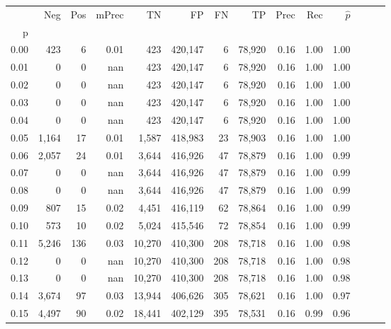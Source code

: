 \begin{tabular}{rrrrrrrrrrrrrr}
\toprule
{} &     Neg &    Pos & mPrec &       TN &       FP &      FN &      TP &  Prec &   Rec & $\hat{p}$ \\
p    &         &        &       &          &          &         &         &       &       &           \\
\midrule
0.00 &     423 &      6 &  0.01 &      423 &  420,147 &       6 &  78,920 &  0.16 &  1.00 &      1.00 \\
0.01 &       0 &      0 &   nan &      423 &  420,147 &       6 &  78,920 &  0.16 &  1.00 &      1.00 \\
0.02 &       0 &      0 &   nan &      423 &  420,147 &       6 &  78,920 &  0.16 &  1.00 &      1.00 \\
0.03 &       0 &      0 &   nan &      423 &  420,147 &       6 &  78,920 &  0.16 &  1.00 &      1.00 \\
0.04 &       0 &      0 &   nan &      423 &  420,147 &       6 &  78,920 &  0.16 &  1.00 &      1.00 \\
0.05 &   1,164 &     17 &  0.01 &    1,587 &  418,983 &      23 &  78,903 &  0.16 &  1.00 &      1.00 \\
0.06 &   2,057 &     24 &  0.01 &    3,644 &  416,926 &      47 &  78,879 &  0.16 &  1.00 &      0.99 \\
0.07 &       0 &      0 &   nan &    3,644 &  416,926 &      47 &  78,879 &  0.16 &  1.00 &      0.99 \\
0.08 &       0 &      0 &   nan &    3,644 &  416,926 &      47 &  78,879 &  0.16 &  1.00 &      0.99 \\
0.09 &     807 &     15 &  0.02 &    4,451 &  416,119 &      62 &  78,864 &  0.16 &  1.00 &      0.99 \\
0.10 &     573 &     10 &  0.02 &    5,024 &  415,546 &      72 &  78,854 &  0.16 &  1.00 &      0.99 \\
0.11 &   5,246 &    136 &  0.03 &   10,270 &  410,300 &     208 &  78,718 &  0.16 &  1.00 &      0.98 \\
0.12 &       0 &      0 &   nan &   10,270 &  410,300 &     208 &  78,718 &  0.16 &  1.00 &      0.98 \\
0.13 &       0 &      0 &   nan &   10,270 &  410,300 &     208 &  78,718 &  0.16 &  1.00 &      0.98 \\
0.14 &   3,674 &     97 &  0.03 &   13,944 &  406,626 &     305 &  78,621 &  0.16 &  1.00 &      0.97 \\
0.15 &   4,497 &     90 &  0.02 &   18,441 &  402,129 &     395 &  78,531 &  0.16 &  0.99 &      0.96 \\

\end{tabular}
